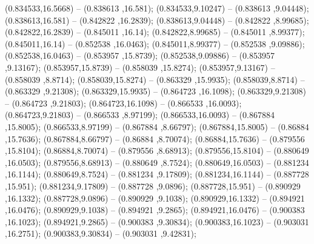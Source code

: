  (0.834533,16.5668) -- (0.838613 ,16.581);
 (0.834533,9.10247) -- (0.838613 ,9.04448);
 (0.838613,16.581) -- (0.842822 ,16.2839);
 (0.838613,9.04448) -- (0.842822 ,8.99685);
 (0.842822,16.2839) -- (0.845011 ,16.14);
 (0.842822,8.99685) -- (0.845011 ,8.99377);
 (0.845011,16.14) -- (0.852538 ,16.0463);
 (0.845011,8.99377) -- (0.852538 ,9.09886);
 (0.852538,16.0463) -- (0.853957 ,15.8739);
 (0.852538,9.09886) -- (0.853957 ,9.13167);
 (0.853957,15.8739) -- (0.858039 ,15.8274);
 (0.853957,9.13167) -- (0.858039 ,8.8714);
 (0.858039,15.8274) -- (0.863329 ,15.9935);
 (0.858039,8.8714) -- (0.863329 ,9.21308);
 (0.863329,15.9935) -- (0.864723 ,16.1098);
 (0.863329,9.21308) -- (0.864723 ,9.21803);
 (0.864723,16.1098) -- (0.866533 ,16.0093);
 (0.864723,9.21803) -- (0.866533 ,8.97199);
 (0.866533,16.0093) -- (0.867884 ,15.8005);
 (0.866533,8.97199) -- (0.867884 ,8.66797);
 (0.867884,15.8005) -- (0.86884 ,15.7636);
 (0.867884,8.66797) -- (0.86884 ,8.70074);
 (0.86884,15.7636) -- (0.879556 ,15.8104);
 (0.86884,8.70074) -- (0.879556 ,8.68913);
 (0.879556,15.8104) -- (0.880649 ,16.0503);
 (0.879556,8.68913) -- (0.880649 ,8.7524);
 (0.880649,16.0503) -- (0.881234 ,16.1144);
 (0.880649,8.7524) -- (0.881234 ,9.17809);
 (0.881234,16.1144) -- (0.887728 ,15.951);
 (0.881234,9.17809) -- (0.887728 ,9.0896);
 (0.887728,15.951) -- (0.890929 ,16.1332);
 (0.887728,9.0896) -- (0.890929 ,9.1038);
 (0.890929,16.1332) -- (0.894921 ,16.0476);
 (0.890929,9.1038) -- (0.894921 ,9.2865);
 (0.894921,16.0476) -- (0.900383 ,16.1023);
 (0.894921,9.2865) -- (0.900383 ,9.30834);
 (0.900383,16.1023) -- (0.903031 ,16.2751);
 (0.900383,9.30834) -- (0.903031 ,9.42831);
